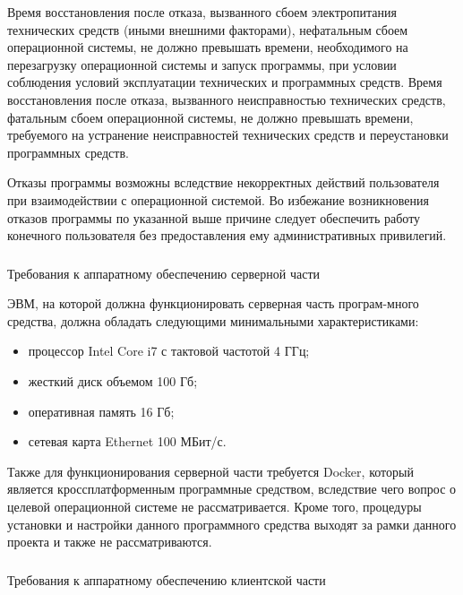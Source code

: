 Время восстановления после отказа, вызванного сбоем электропитания технических средств (иными внешними факторами), 
нефатальным сбоем операционной системы, не должно превышать времени, необходимого на перезагрузку операционной системы и запуск программы, 
при условии соблюдения условий эксплуатации технических и программных средств. Время восстановления после отказа, вызванного неисправностью технических средств,
фатальным сбоем операционной системы, не должно превышать времени, требуемого на устранение неисправностей технических средств и переустановки программных средств.

Отказы программы возможны вследствие некорректных действий \linebreak пользователя при взаимодействии с операционной системой. 
Во избежание возникновения отказов программы по указанной выше причине следует обеспечить работу конечного пользователя без предоставления ему административных привилегий.

\subsubsection{} Требования к аппаратному обеспечению серверной части
\label{sec:analysis:requirements:hardware_server}

ЭВМ, на которой должна функционировать серверная часть програм-много средства, должна обладать следующими минимальными характеристиками:

\begin{itemize}
	\item процессор Intel Core i7 с тактовой частотой 4 ГГц;
	\item жесткий диск объемом 100 Гб;
	\item оперативная память 16 Гб;
	\item сетевая карта Ethernet 100 МБит/с.
\end{itemize} 

Также для функционирования серверной части требуется Docker, который является кроссплатформенным программные средством, вследствие чего вопрос о целевой операционной системе не
рассматривается. Кроме того, процедуры установки и настройки данного программного средства выходят за рамки данного проекта и также не рассматриваются.

\subsubsection{}Требования к аппаратному обеспечению клиентской части
\label{sec:analysis:requirements:hardware_client}

